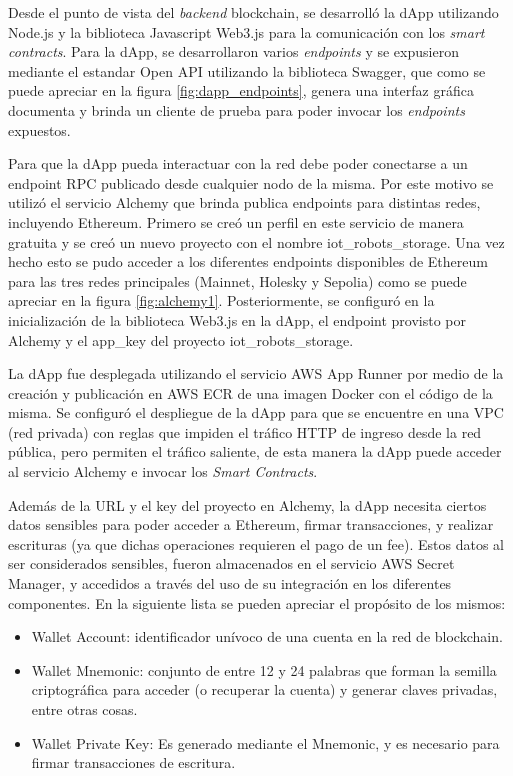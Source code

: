 Desde el punto de vista del \textit{backend} blockchain, se desarrolló la dApp utilizando Node.js y la biblioteca Javascript Web3.js para la comunicación con los \textit{smart contracts}. Para la dApp, se desarrollaron varios \textit{endpoints} y se expusieron mediante el estandar Open API \citep{open_api} utilizando la biblioteca Swagger, que como se puede apreciar en la figura \ref{fig:dapp_endpoints}, genera una interfaz gráfica documenta y brinda un cliente de prueba para poder invocar los \textit{endpoints} expuestos.


Para que la dApp pueda interactuar con la red debe poder conectarse a un endpoint RPC publicado desde cualquier nodo de la misma. Por este motivo se utilizó el servicio Alchemy que brinda publica endpoints para distintas redes, incluyendo Ethereum. Primero se creó un perfil en este servicio de manera gratuita y se creó un nuevo proyecto con el nombre iot\_robots\_storage. Una vez hecho esto se pudo acceder a los diferentes endpoints disponibles de Ethereum para las tres redes principales (Mainnet, Holesky y Sepolia) como se puede apreciar en la figura \ref{fig:alchemy1}. Posteriormente, se configuró en la inicialización de la biblioteca Web3.js en la dApp, el endpoint provisto por Alchemy y el app\_key del proyecto iot\_robots\_storage. 

La dApp fue desplegada utilizando el servicio AWS App Runner por medio de la creación y publicación en AWS ECR de una imagen Docker con el código de la misma. Se configuró el despliegue de la dApp para que se encuentre en una VPC (red privada) con reglas que impiden el tráfico HTTP de ingreso desde la red pública, pero permiten el tráfico saliente, de esta manera la dApp puede acceder al servicio Alchemy e invocar los \textit{Smart Contracts}.

Además de la URL y el key del proyecto en Alchemy, la dApp necesita ciertos datos sensibles para poder acceder a Ethereum, firmar transacciones, y realizar escrituras (ya que dichas operaciones requieren el pago de un fee). Estos datos al ser considerados sensibles, fueron almacenados en el servicio AWS Secret Manager, y accedidos a través del uso de su integración en los diferentes componentes. En la siguiente lista se pueden apreciar el propósito de los mismos:

\begin{itemize}
	\item Wallet Account: identificador unívoco de una cuenta en la red de blockchain.
	\item Wallet Mnemonic: conjunto de entre 12 y 24 palabras que forman la semilla criptográfica para acceder (o recuperar la cuenta) y generar claves privadas, entre otras cosas.
	\item Wallet Private Key: Es generado mediante el Mnemonic, y es necesario para firmar transacciones de escritura.
\end{itemize}


